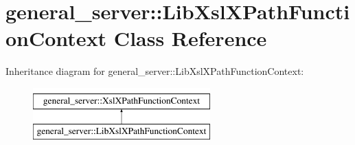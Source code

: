 \hypertarget{classgeneral__server_1_1LibXslXPathFunctionContext}{\section{general\-\_\-server\-:\-:\-Lib\-Xsl\-X\-Path\-Function\-Context \-Class \-Reference}
\label{classgeneral__server_1_1LibXslXPathFunctionContext}
}
\-Inheritance diagram for general\-\_\-server\-:\-:\-Lib\-Xsl\-X\-Path\-Function\-Context\-:\begin{figure}[H]
\begin{center}
\leavevmode
\includegraphics[height=2.000000cm]{classgeneral__server_1_1LibXslXPathFunctionContext}
\end{center}
\end{figure}

